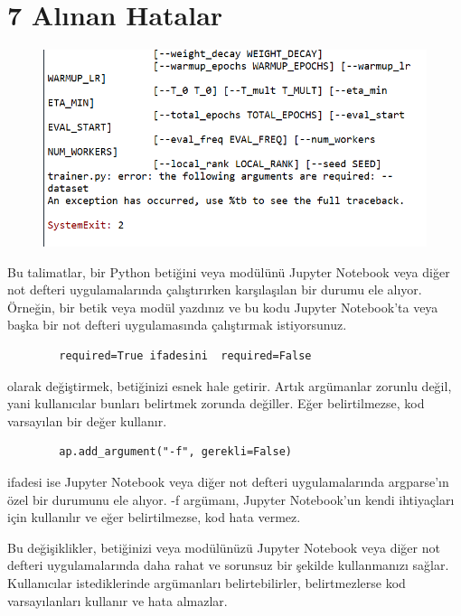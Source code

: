 \documentclass[10pt,a4paper]{report}
\begin{document}
	
	
	
	\section*{7 Alınan Hatalar}
	
	\begin{figure}[!h]
		
		\centering
		\includegraphics[width=\linewidth]{Hata1}
		\caption{\cite{ma2024clip}}
		
		
	\end{figure}
	\raggedright
	Bu talimatlar, bir Python betiğini veya modülünü Jupyter Notebook veya diğer not defteri uygulamalarında çalıştırırken karşılaşılan bir durumu ele alıyor. Örneğin, bir betik veya modül yazdınız ve bu kodu Jupyter Notebook'ta veya başka bir not defteri uygulamasında çalıştırmak istiyorsunuz.
	
	\begin{verbatim}
		required=True ifadesini  required=False\end{verbatim} olarak değiştirmek, betiğinizi esnek hale getirir. Artık argümanlar zorunlu değil, yani kullanıcılar bunları belirtmek zorunda değiller. Eğer belirtilmezse, kod varsayılan bir değer kullanır.
	
	\begin{verbatim}
		ap.add_argument("-f", gerekli=False)	\end{verbatim}
	
	ifadesi ise Jupyter Notebook veya diğer not defteri uygulamalarında argparse'ın özel bir durumunu ele alıyor. -f argümanı, Jupyter Notebook'un kendi ihtiyaçları için kullanılır ve eğer belirtilmezse, kod hata vermez.
	
	
	Bu değişiklikler, betiğinizi veya modülünüzü Jupyter Notebook veya diğer not defteri uygulamalarında daha rahat ve sorunsuz bir şekilde kullanmanızı sağlar. Kullanıcılar istediklerinde argümanları belirtebilirler, belirtmezlerse kod varsayılanları kullanır ve hata almazlar\cite{CB_Acnt}.
	
\end{document}

